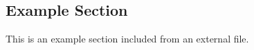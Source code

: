\subsection{Example Section}
This is an example section included from an external file.

\lipsum[8-9]
